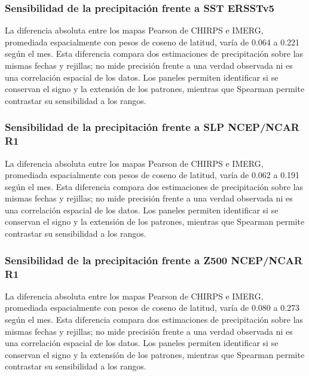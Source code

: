 \documentclass[10pt,a4paper]{article}
\begin{document}
\subsubsection*{Sensibilidad de la precipitación frente a SST ERSSTv5}
La diferencia absoluta entre los mapas Pearson de CHIRPS e IMERG, promediada espacialmente con pesos de coseno de latitud, varía de 0.064 a 0.221 según el mes. Esta diferencia compara dos estimaciones de precipitación sobre las mismas fechas y rejillas; no mide precisión frente a una verdad observada ni es una correlación espacial de los datos. Los paneles permiten identificar si se conservan el signo y la extensión de los patrones, mientras que Spearman permite contrastar su sensibilidad a los rangos.

\subsubsection*{Sensibilidad de la precipitación frente a SLP NCEP/NCAR R1}
La diferencia absoluta entre los mapas Pearson de CHIRPS e IMERG, promediada espacialmente con pesos de coseno de latitud, varía de 0.062 a 0.191 según el mes. Esta diferencia compara dos estimaciones de precipitación sobre las mismas fechas y rejillas; no mide precisión frente a una verdad observada ni es una correlación espacial de los datos. Los paneles permiten identificar si se conservan el signo y la extensión de los patrones, mientras que Spearman permite contrastar su sensibilidad a los rangos.

\subsubsection*{Sensibilidad de la precipitación frente a Z500 NCEP/NCAR R1}
La diferencia absoluta entre los mapas Pearson de CHIRPS e IMERG, promediada espacialmente con pesos de coseno de latitud, varía de 0.080 a 0.273 según el mes. Esta diferencia compara dos estimaciones de precipitación sobre las mismas fechas y rejillas; no mide precisión frente a una verdad observada ni es una correlación espacial de los datos. Los paneles permiten identificar si se conservan el signo y la extensión de los patrones, mientras que Spearman permite contrastar su sensibilidad a los rangos.
\end{document}
